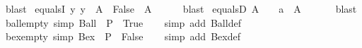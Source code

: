 \begin{isabellebody}
%
\isatagproof
{}\isamarkupfalse%
\ blast%
\endisatagproof
{\isafoldproof}%
%
\isadelimproof
\isanewline
%
\endisadelimproof
\isanewline
{}\isamarkupfalse%
\ equals{}I{\isacharcolon}{\kern0pt}\ {\isachardoublequoteopen}{\isacharparenleft}{\kern0pt}{\isasymAnd}y{\isachardot}{\kern0pt}\ y\ {\isasymin}\ A\ {\isasymLongrightarrow}\ False{\isacharparenright}{\kern0pt}\ {\isasymLongrightarrow}\ A\ {\isacharequal}{\kern0pt}\ {\isacharbraceleft}{\kern0pt}{\isacharbraceright}{\kern0pt}{\isachardoublequoteclose}\isanewline
%
\isadelimproof
\ \ %
\endisadelimproof
%
\isatagproof
{}\isamarkupfalse%
\ blast%
\endisatagproof
{\isafoldproof}%
%
\isadelimproof
\isanewline
%
\endisadelimproof
\isanewline
{}\isamarkupfalse%
\ equals{}D{\isacharcolon}{\kern0pt}\ {\isachardoublequoteopen}A\ {\isacharequal}{\kern0pt}\ {\isacharbraceleft}{\kern0pt}{\isacharbraceright}{\kern0pt}\ {\isasymLongrightarrow}\ a\ {\isasymnotin}\ A{\isachardoublequoteclose}\isanewline
\ \ %
\isanewline
%
\isadelimproof
\ \ %
\endisadelimproof
%
\isatagproof
{}\isamarkupfalse%
\ blast%
\endisatagproof
{\isafoldproof}%
%
\isadelimproof
\isanewline
%
\endisadelimproof
\isanewline
{}\isamarkupfalse%
\ ball{\isacharunderscore}{\kern0pt}empty\ {\isacharbrackleft}{\kern0pt}simp{\isacharbrackright}{\kern0pt}{\isacharcolon}{\kern0pt}\ {\isachardoublequoteopen}Ball\ {\isacharbraceleft}{\kern0pt}{\isacharbraceright}{\kern0pt}\ P\ {\isasymlongleftrightarrow}\ True{\isachardoublequoteclose}\isanewline
%
\isadelimproof
\ \ %
\endisadelimproof
%
\isatagproof
{}\isamarkupfalse%
\ {\isacharparenleft}{\kern0pt}simp\ add{\isacharcolon}{\kern0pt}\ Ball{\isacharunderscore}{\kern0pt}def{\isacharparenright}{\kern0pt}%
\endisatagproof
{\isafoldproof}%
%
\isadelimproof
\isanewline
%
\endisadelimproof
\isanewline
{}\isamarkupfalse%
\ bex{\isacharunderscore}{\kern0pt}empty\ {\isacharbrackleft}{\kern0pt}simp{\isacharbrackright}{\kern0pt}{\isacharcolon}{\kern0pt}\ {\isachardoublequoteopen}Bex\ {\isacharbraceleft}{\kern0pt}{\isacharbraceright}{\kern0pt}\ P\ {\isasymlongleftrightarrow}\ False{\isachardoublequoteclose}\isanewline
%
\isadelimproof
\ \ %
\endisadelimproof
%
\isatagproof
{}\isamarkupfalse%
\ {\isacharparenleft}{\kern0pt}simp\ add{\isacharcolon}{\kern0pt}\ Bex{\isacharunderscore}{\kern0pt}def{\isacharparenright}{\kern0pt}%

\end{isabellebody}
